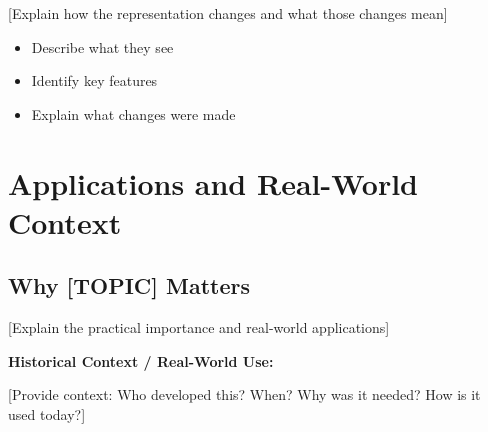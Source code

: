 \documentclass[12pt,letterpaper]{article}
\begin{document}
[Explain how the representation changes and what those changes mean]

\begin{analogy}
\end{analogy}

\begin{example}
\begin{itemize}
  \item Describe what they see
  \item Identify key features
  \item Explain what changes were made
\end{itemize}
\end{example}

\begin{solution}
\end{solution}


\section{Applications and Real-World Context}

\subsection{Why [TOPIC] Matters}

[Explain the practical importance and real-world applications]

\begin{contextbox}
\textbf{Historical Context / Real-World Use:}

[Provide context: Who developed this? When? Why was it needed? How is it used today?]
\end{contextbox}
\end{document}
